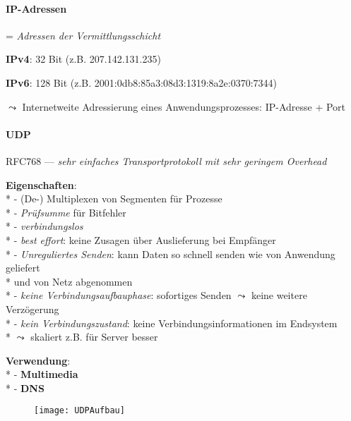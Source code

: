 \paragraph{IP-Adressen}
\begin{items}
  \item = \emph{Adressen der Vermittlungsschicht}
  \item \textbf{IPv4}: 32 Bit (z.B. 207.142.131.235)
  \item \textbf{IPv6}: 128 Bit (z.B. 2001:0db8:85a3:08d3:1319:8a2e:0370:7344)
  \item \( \leadsto \) Internetweite Adressierung eines Anwendungsprozesses: IP-Adresse + Port
\end{items}

\paragraph{UDP}
\begin{items}
  \item RFC768 --- \emph{sehr einfaches Transportprotokoll mit sehr geringem Overhead}
  \item \textbf{Eigenschaften}: \\*
    - (De-) Multiplexen von Segmenten für Prozesse \\*
    - \emph{Prüfsumme} für Bitfehler \\*
    - \emph{verbindungslos} \\*
    - \emph{best effort}: keine Zusagen über Auslieferung bei Empfänger \\*
    - \emph{Unreguliertes Senden}: kann Daten so schnell senden wie von Anwendung geliefert \\* \phantom{-} und von Netz abgenommen \\*
    - \emph{keine Verbindungsaufbauphase}: sofortiges Senden \( \leadsto \) keine weitere Verzögerung \\*
    - \emph{kein Verbindungszustand}: keine Verbindungsinformationen im Endsystem \\* \phantom{-} \( \leadsto \) skaliert z.B. für Server besser
  \item \textbf{Verwendung}: \\*
    - \textbf{Multimedia} \\*
    - \textbf{DNS}
\end{items}
\begin{figure}[H]\centering\label{UDPAufbau}\texttt{[image: UDPAufbau]}\end{figure}

